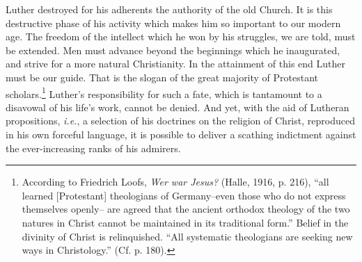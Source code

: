 Luther destroyed for his adherents the authority of the old Church.
It is this destructive phase of his activity which makes him so important
to our modern age. The freedom of the intellect which he won
by his struggles, we are told, must be extended. Men must advance
beyond the beginnings which he inaugurated, and strive for a more
natural Christianity. In the attainment of this end Luther must be
our guide. That is the slogan of the great majority of Protestant
scholars.\footnote
{According to Friedrich Loofs, \textit{Wer war Jesus?} (Halle, 1916, p. 216), “all learned
[Protestant] theologians of Germany--even those who do not express themselves openly--
are agreed that the ancient orthodox theology of the two natures in Christ cannot be maintained
in its traditional form.” Belief in the divinity of Christ is relinquished. “All systematic theologians are seeking new ways in Christology.” (Cf. p. 180).}
Luther’s responsibility for such a fate, which is tantamount
to a disavowal of his life’s work, cannot be denied. And yet, with
the aid of Lutheran propositions, \textit{i.e.}, a selection of his doctrines on
the religion of Christ, reproduced in his own forceful language, it is
possible to deliver a scathing indictment against the ever-increasing
ranks of his admirers.
